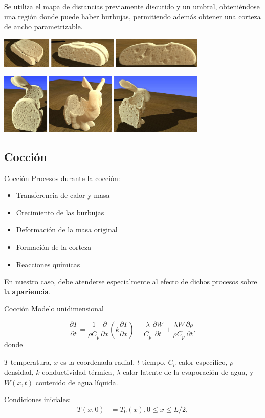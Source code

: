 \documentclass[spanish]{beamer}
\begin{document}
\begin{frame}
Se utiliza el mapa de distancias previamente discutido y un umbral, obteniéndose una región donde puede haber burbujas, permitiendo además obtener una corteza de ancho parametrizable.


\centerline{\includegraphics[width=10cm]{../figures/prebakebread}}
\centerline{\includegraphics[width=10cm]{../figures/prebakebunny}}
\end{frame}

\subsection{Cocción}

\begin{frame}{Cocción}
Procesos durante la cocción:

\begin{itemize}
\item Transferencia de calor y masa
\item Crecimiento de las burbujas
\item Deformación de la masa original
\item Formación de la corteza
\item Reacciones químicas
\end{itemize}

En nuestro caso, debe atenderse especialmente al efecto de dichos procesos sobre la \textbf{apariencia}.

\end{frame}

\begin{frame}{Cocción}
Modelo unidimensional

\begin{equation}
\label{Eq:heat}
\frac{\partial T}{\partial t} = \frac{1}{\rho C_{p}} \frac{\partial}{\partial x} \left ( k \frac{\partial T}{\partial x} \right ) + \frac{\lambda}{C_{p}} \frac{\partial W}{\partial t}+\frac{\lambda W}{ \rho C_{p} }\frac{\partial \rho}{\partial t},
\end{equation}
%
\noindent donde

$T$ temperatura, $x$ es la coordenada radial, $t$ tiempo, $C_{p}$ calor específico, $\rho$ densidad, $k$ conductividad térmica, $\lambda$ calor latente de la evaporación de agua, y $W(x,t)$ contenido de agua líquida.

Condiciones iniciales:
\begin{align*}
T(x,0) &= T_{0}(x), 0\le x \le L/2,
\end{align*}

\end{frame}
\end{document}
